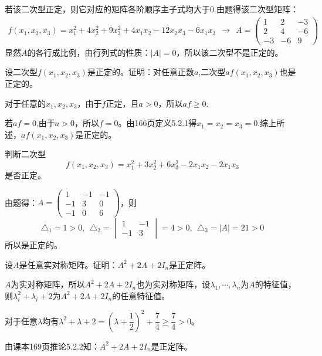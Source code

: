 \documentclass[a4paper]{report}
\begin{document}
\begin{jie}
若该二次型正定，则它对应的矩阵各阶顺序主子式均大于0.由题得该二次型矩阵：
\begin{align*}
f(x_1,x_2,x_3)=x_1^2+4x_2^2+9x_3^2+4x_1x_2-12x_2x_3-6x_1x_3~~\rightarrow~~A=
\begin{pmatrix}
1&2&-3\\
2&4&-6\\
-3&-6&9
\end{pmatrix}
\end{align*}
显然$A$的各行成比例，由行列式的性质：$|A|=0$，所以该二次型不是正定的。
\end{jie}

\EX 设二次型$f(x_1,x_2,x_3)$是正定的。证明：对任意正数$a$,二次型$af(x_1,x_2,x_3)$也是正定的。

\begin{zhengming}
对于任意的$x_1,x_2,x_3$，由于$f$正定，且$a>0$，所以$af\geq 0$.

若$af=0$,由于$a>0$，所以$f=0$。由166页定义5.2.1得$x_1=x_2=x_3=0$.综上所述，$af(x_1,x_2,x_3)$是正定的。
\end{zhengming}

\EX 判断二次型
\begin{equation*}
f(x_1,x_2,x_3)=x_1^2+3x_2^2+6x_3^2-2x_1x_2-2x_1x_3
\end{equation*}
是否正定。

\begin{jie}
由题得：$A=
\begin{pmatrix}
1&-1&-1\\
-1&3&0\\
-1&0&6
\end{pmatrix}
$，则
\begin{equation*}
\triangle_1=1>0,~~\triangle_2=\begin{vmatrix}
                               1&-1\\
-1&3
                              \end{vmatrix}
=4>0,~~\triangle_3=|A|=21>0
\end{equation*}
所以是正定的。
\end{jie}

\EX 设$A$是任意实对称矩阵。证明：$A^2+2A+2I_n$是正定阵。

\begin{zhengming}
$A$为实对称矩阵，所以$A^2+2A+2I_n$也为实对称矩阵，设$\lambda_1,\cdots,\lambda_n$为$A$的特征值，则$\lambda_i^2+\lambda_i+2$为$A^2+2A+2I_n$的任意特征值。

对于任意$\lambda$均有$\lambda^2+\lambda+2=\left(\lambda+\dfrac{1}{2}\right)^2+\dfrac{7}{4}\geq \dfrac{7}{4}>0$。

由课本169页推论5.2.2知：$A^2+2A+2I_n$是正定阵。
\end{zhengming}
\end{document}
